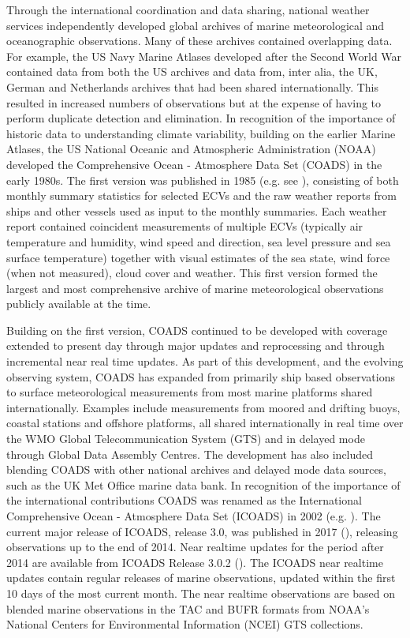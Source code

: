 Through the international coordination and data sharing, national weather services independently developed global archives of marine meteorological and oceanographic observations.
Many of these archives contained overlapping data. 
For example, the US Navy Marine Atlases developed after the Second World War contained data from both the US archives and data from, inter alia, the UK, German and Netherlands archives that had been shared internationally. 
This resulted in increased numbers of observations but at the expense of having to perform duplicate detection and elimination.
In recognition of the importance of historic data to understanding climate variability, building on the earlier Marine Atlases, the US National Oceanic and Atmospheric Administration (NOAA) developed the Comprehensive Ocean - Atmosphere Data Set (COADS) in the early 1980s.
The first version was published in 1985 (e.g. see \cite{Woodruff1987}), consisting of both monthly summary statistics for selected ECVs and the raw weather reports from ships and other vessels used as input to the monthly summaries.
Each weather report contained coincident measurements of multiple ECVs (typically air temperature and humidity, wind speed and direction, sea level pressure and sea surface temperature) together with visual estimates of the sea state, wind force (when not measured), cloud cover and weather. 
This first version formed the largest and most comprehensive archive of marine meteorological observations publicly available at the time. 

Building on the first version, COADS continued to be developed with coverage extended to present day through major updates and reprocessing and through incremental near real time updates. 
As part of this development, and the evolving observing system, COADS has expanded from primarily ship based observations to surface meteorological measurements from most marine platforms shared internationally.
Examples include measurements from moored and drifting buoys, coastal stations and offshore platforms, all shared internationally in real time over the WMO Global Telecommunication System (GTS) and in delayed mode through Global Data Assembly Centres.
The development has also included blending COADS with other national archives and delayed mode data sources, such as the UK Met Office marine data bank.
In recognition of the importance of the international contributions COADS was renamed as the International Comprehensive Ocean - Atmosphere Data Set (ICOADS) in 2002 (e.g. \cite{Worley2005}). 
The current major release of ICOADS, release 3.0, was published in 2017 (\cite{Freeman2017}), releasing observations up to the end of 2014.
Near realtime updates for the period after 2014 are available from ICOADS Release 3.0.2 (\cite{Liu2022}).
The ICOADS near realtime updates contain regular releases of marine observations, updated within the first 10 days of the most current month. The near realtime observations are based on blended marine observations in the TAC and BUFR formats from NOAA's National Centers for Environmental Information (NCEI) GTS collections. 

